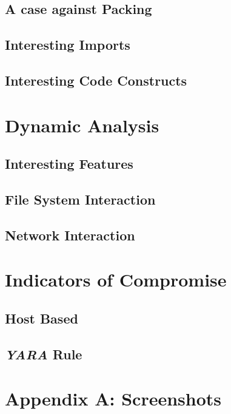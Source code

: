 \documentclass[10pt,a4paper]{article}
\begin{document}
	\subsection{A case against Packing}

	\subsection{Interesting Imports}

	\subsection{Interesting Code Constructs}

\newpage
\section{Dynamic Analysis}
	\subsection{Interesting Features}

	\subsection{File System Interaction}

	\subsection{Network Interaction}

\newpage

\section{Indicators of Compromise}
	\subsection{Host Based}
	\subsection{\textit{YARA} Rule}

\newpage
\section{Appendix A: Screenshots}


\newpage
\end{document}
